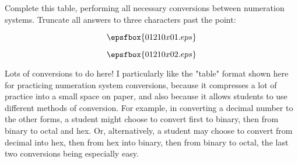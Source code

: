 

Complete this table, performing all necessary conversions between numeration systems.  Truncate all answers to three characters past the point:

$$\epsfbox{01210x01.eps}$$







$$\epsfbox{01210x02.eps}$$







Lots of conversions to do here!  I particularly like the "table" format shown here for practicing numeration system conversions, because it compresses a lot of practice into a small space on paper, and also because it allows students to use different methods of conversion.  For example, in converting a decimal number to the other forms, a student might choose to convert first to binary, then from binary to octal and hex.  Or, alternatively, a student may choose to convert from decimal into hex, then from hex into binary, then from binary to octal, the last two conversions being especially easy.




